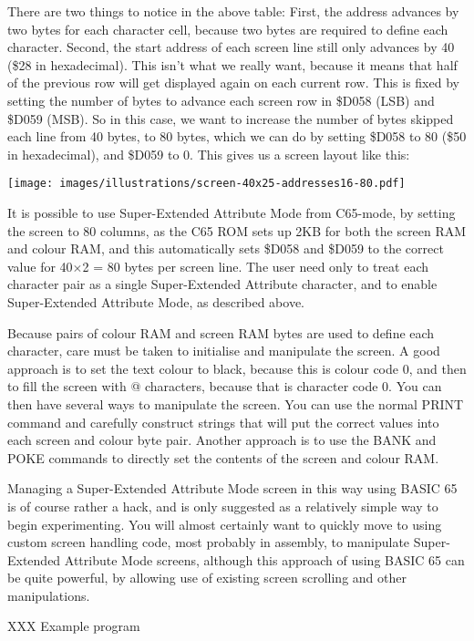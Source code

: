 There are two things to notice in the above table: First, the address advances by two bytes for each character cell, because two bytes are required to define each character.  Second, the start address of each screen line still only advances by 40 (\$28 in hexadecimal). This isn't what we really want, because it means that half of the previous row will get displayed again on each current row.  This is fixed by setting the number of bytes to advance each screen row in \$D058 (LSB) and \$D059 (MSB). So in this case, we want to increase the number of bytes skipped each line from 40 bytes, to 80 bytes, which we can do by setting \$D058 to 80 (\$50 in hexadecimal), and \$D059 to 0.  This gives us a screen layout like this:

\texttt{[image: images/illustrations/screen-40x25-addresses16-80.pdf]}

It is possible to use Super-Extended Attribute Mode from C65-mode, by setting the screen to 80 columns, as the C65 ROM sets up 2KB for both the screen RAM and colour RAM, and this automatically sets \$D058 and \$D059 to the correct value for 40$\times$2 = 80 bytes per screen line.  The user need only to treat each character pair as a single Super-Extended Attribute character, and to enable Super-Extended Attribute Mode, as described above.

Because pairs of colour RAM and screen RAM bytes are used to define each character, care must be taken to initialise and manipulate the screen.
A good approach is to set the text colour to black, because this is colour code 0, and then to fill the screen with @ characters, because that is
character code 0.  You can then have several ways to manipulate the screen.  You can use the normal PRINT command and carefully construct
strings that will put the correct values into each screen and colour byte pair. Another approach is to use the BANK and POKE commands to directly set the contents of the screen and colour RAM.

Managing a Super-Extended Attribute Mode screen in this way using BASIC 65 is of course rather a hack, and is only suggested as a relatively simple way to begin experimenting.  You will almost certainly want to quickly move to using custom screen handling code, most probably in assembly, to manipulate Super-Extended Attribute Mode screens, although this approach of using BASIC 65 can be quite powerful, by allowing use of existing screen scrolling and other manipulations.

XXX Example program

